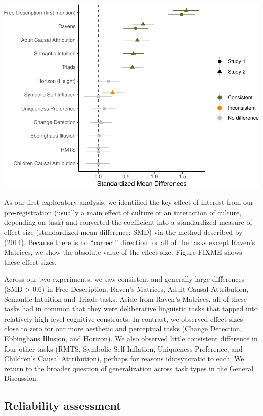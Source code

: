 \documentclass[
  man]{apa6}
\begin{document}
\includegraphics{CCRR_manuscript_files/figure-latex/unnamed-chunk-24-1.pdf}

As our first exploratory analysis, we identified the key effect of interest from our pre-registration (usually a main effect of culture or an interaction of culture, depending on task) and converted the coefficient into a standardized measure of effect size (standardized mean difference; SMD) via the method described by (2014). Because there is no ``correct'' direction for all of the tasks except Raven's Matrices, we show the absolute value of the effect size. Figure FIXME shows these effect sizes.

Across our two experiments, we saw consistent and generally large differences (SMD \textgreater{} 0.6) in Free Description, Raven's Matrices, Adult Causal Attribution, Semantic Intuition and Triads tasks. Aside from Raven's Matrices, all of these tasks had in common that they were deliberative linguistic tasks that tapped into relatively high-level cognitive constructs. In contrast, we observed effect sizes close to zero for our more aesthetic and perceptual tasks (Change Detection, Ebbinghaus Illusion, and Horizon). We also observed little consistent difference in four other tasks (RMTS, Symbolic Self-Inflation, Uniqueness Preference, and Children's Causal Attribution), perhaps for reasons idiosyncratic to each. We return to the broader question of generalization across task types in the General Discussion.

\hypertarget{reliability-assessment}{%
\subsection{Reliability assessment}\label{reliability-assessment}}
\end{document}
